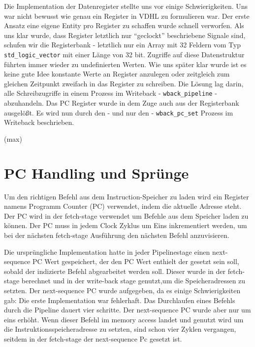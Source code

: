 \documentclass[paper=a4,fontsize=12pt,twocolumn]{scrreprt}
\begin{document}
Die Implementation der Datenregister stellte uns vor einige Schwierigkeiten.
Uns war nicht bewusst wie genau ein Register in VDHL zu formulieren war.
Der erste Ansatz eine eigene Entity pro Register zu schaffen wurde schnell verworfen.
Als uns klar wurde, dass Register letztlich nur \enquote{geclockt} beschriebene Signale sind, schufen wir die Registerbank - letztlich nur ein Array mit 32 Feldern vom  Typ \texttt{std\_logic\_vector} mit einer Länge von 32 bit.
Zugriffe auf diese Datenstruktur führten immer wieder zu undefinierten Werten.
Wie uns später klar wurde ist es keine gute Idee konstante Werte an Register anzulegen oder zeitgleich zum gleichen Zeitpunkt zweifach in das Register zu schreiben.
Die Lösung lag darin, alle Schreibzugriffe in einem Prozess im Writeback - \texttt{wback\_pipeline} - abzuhandeln.
Das PC Register wurde in dem Zuge auch aus der Registerbank ausgelößt. 
Es wird nun durch den - und nur den - \texttt{wback\_pc\_set} Prozess im Writeback beschrieben. %

(max)

\section{PC Handling und Sprünge}
Um den richtigen Befehl aus dem Instruction-Speicher zu laden wird ein Register namens Programm Counter (PC) verwendet, indem die aktuelle Adresse steht.
Der PC wird in der fetch-stage verwendet um Befehle aus dem Speicher laden zu können.
Der PC muss in jedem Clock Zyklus um Eins inkrementiert werden, um bei der nächsten fetch-stage Ausführung den nächsten Befehl anzuvisieren. 

Die ursprüngliche Implementation hatte in jeder Pipelinestage einen next-sequence PC Wert gespeichert, der den PC Wert enthielt der gesetzt sein soll, sobald der indizierte Befehl abgearbeitet werden soll.
Dieser wurde in der fetch-stage berechnet und in der write-back stage genutzt,um die Speicheradressen zu setzten. 
Der next-sequence PC wurde aufgegeben, da es einige Schwierigkeiten gab:
Die erste Implementation war fehlerhaft.
Das Durchlaufen eines Befehls durch die Pipeline dauert vier schritte.
Der next-sequence PC wurde aber nur um eins erhöht.
Wenn dieser Befehl im memory access landet und genutzt wird um die Instruktionsspeicheradresse zu setzten, sind schon vier Zyklen vergangen, seitdem in der fetch-stage der next-sequence Pc gesetzt ist.
\end{document}
